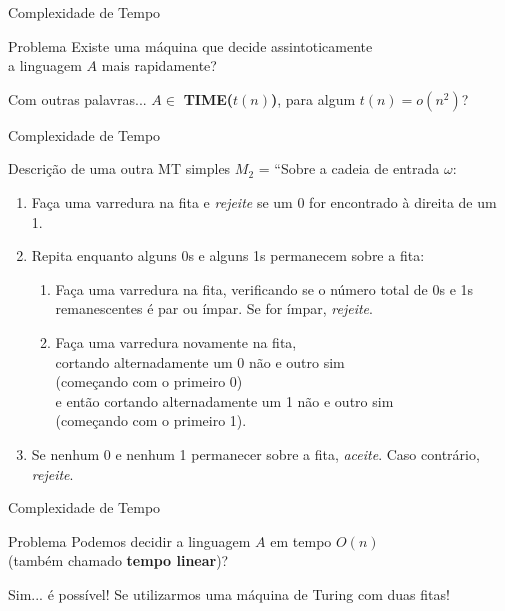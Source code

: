 \documentclass[xcolor=dvipsnames,table]{beamer}
\begin{document}
	\begin{frame}{Complexidade de Tempo}
		\begin{block}{Problema}
			Existe uma máquina que decide assintoticamente \\a linguagem $A$ mais rapidamente?
		\end{block} \pause
		\begin{block}{Com outras palavras...}
			$A \in$ {\bf TIME($t(n)$)}, para algum $t(n) = o(n^2)$?
		\end{block}
	\end{frame}
	
	\begin{frame}[shrink]{Complexidade de Tempo}
		\begin{block}{Descrição de uma outra MT simples}
			$M_2$ = ``Sobre a cadeia de entrada $\omega$:
			\begin{enumerate}
				\item Faça uma varredura na fita e {\it rejeite} se um 0 for encontrado à direita de um 1.
				\item Repita enquanto alguns 0s e alguns 1s permanecem sobre a fita:
				\begin{enumerate}
					\item Faça uma varredura na fita, verificando se o número total de 0s e 1s remanescentes é par ou ímpar. Se for ímpar, {\it rejeite}.
					\item Faça uma varredura novamente na fita, \\cortando alternadamente um 0 não e outro sim \\(começando com o primeiro 0) \\e então cortando alternadamente um 1 não e outro sim \\(começando com o primeiro 1).
				\end{enumerate}
				\item Se nenhum 0 e nenhum 1 permanecer sobre a fita, {\it aceite}. Caso contrário, {\it rejeite}.
			\end{enumerate}
		\end{block}
	\end{frame}
	
	\begin{frame}{Complexidade de Tempo}
		\begin{block}{Problema}
			Podemos decidir a linguagem $A$ em tempo $O(n)$ \\(também chamado {\bf tempo linear})?
		\end{block} \pause
		\begin{exampleblock}{Sim... é possível!}
			Se utilizarmos uma máquina de Turing com duas fitas!
		\end{exampleblock}
	\end{frame}
	
\end{document}

